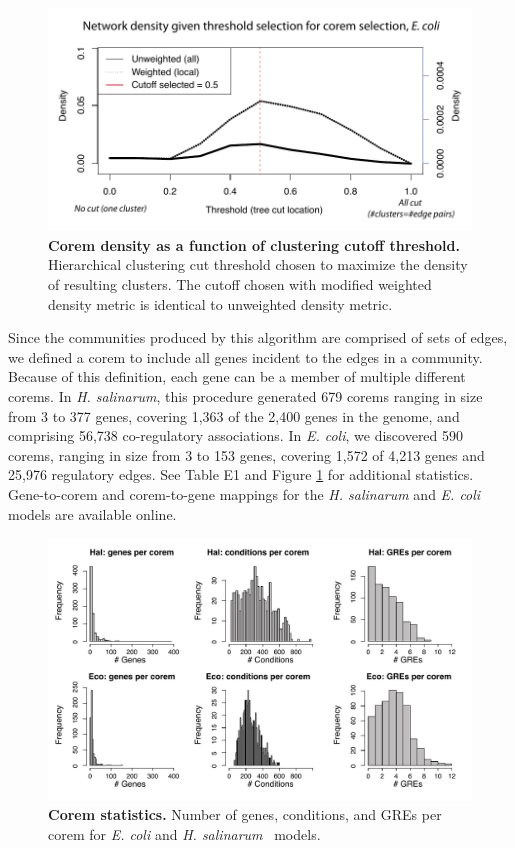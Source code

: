 \begin{figure}[hp]
\centering
\includegraphics[width=0.9\linewidth]{figures/corem_density.pdf}
\caption[Corem density as a function of clustering cutoff threshold]{
{\bf Corem density as a function of clustering cutoff threshold.}
Hierarchical clustering cut threshold chosen to maximize the density
of resulting clusters. The cutoff chosen with modified weighted
density metric is identical to unweighted density metric.}
\label{fig:corem_density}
\end{figure}

Since the communities produced by this algorithm are comprised of sets
of edges, we defined a corem to include all genes incident to the
edges in a community. Because of this definition, each gene can be a
member of multiple different corems. In {\it H. salinarum}, this
procedure generated 679 corems ranging in size from 3 to 377 genes,
covering 1,363 of the 2,400 genes in the genome, and comprising 56,738
co-regulatory associations. In {\it E. coli}, we discovered 590
corems, ranging in size from 3 to 153 genes, covering 1,572 of 4,213
genes and 25,976 regulatory edges. See Table E1 and
Figure \ref{fig:corem_density} for additional
statistics. Gene-to-corem and corem-to-gene mappings for the {\it
H. salinarum} and {\it E. coli} models are available online.

\begin{figure}[hp]
\centering
\includegraphics[width=0.9\linewidth]{figures/corem_stats.pdf}
\caption[Corem statistics]{
{\bf Corem statistics.} Number of genes, conditions, and GREs per
corem for \textit{E. coli} and \textit{H. salinarum} \egrine~models.}
\label{fig:corem_stats}
\end{figure}
